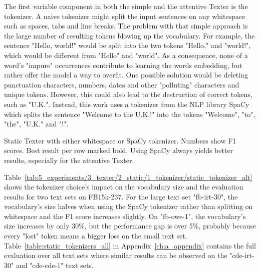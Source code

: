 The first variable component in both the simple and the attentive Texter is the tokenizer. A naive tokenizer might split the input sentences on any whitespace such as spaces, tabs and line breaks. The problem with that simple approach is the large number of resulting tokens blowing up the vocabulary. For example, the sentence "Hello, world!" would be split into the two tokens "Hello," and "world!", which would be different from "Hello" and "world". As a consequence, none of a word's "impure" occurrences contribute to learning the words embedding, but rather offer the model a way to overfit. One possible solution would be deleting punctuation characters, numbers, dates and other "polluting" characters and unique tokens. However, this could also lead to the destruction of correct tokens, such as "U.K.". Instead, this work uses a tokenizer from the NLP library SpaCy~\cite{SpaCy} which splits the sentence "Welcome to the U.K.!" into the tokens "Welcome", "to", "the", "U.K." and "!".

\begin{table}[h]
    \centering
    
    \caption{Static Texter with either whitespace or SpaCy tokenizer. Numbers show F1 scores. Best result per row marked bold. Using SpaCy always yields better results, especially for the attentive Texter.}
    \label{tab:5_experiments/3_texter/2_static/1_tokenizer/static_tokenizer_alt}
\end{table}

Table~\ref{tab:5_experiments/3_texter/2_static/1_tokenizer/static_tokenizer_alt} shows the tokenizer choice's impact on the vocabulary size and the evaluation results for two text sets on FB15k-237. For the large text set "fb-irt-30", the vocabulary's size halves when using the SpaCy tokenizer rather than splitting on whitespace and the F1 score increases slightly. On "fb-owe-1", the vocabulary's size increases by only 30\%, but the performance gap is over 5\%, probably because every "lost" token means a bigger loss on the small text set. Table~\ref{table:static_tokenizers_all} in Appendix~\ref{ch:a_appendix} contains the full evaluation over all text sets where similar results can be observed on the "cde-irt-30" and "cde-cde-1" text sets.
